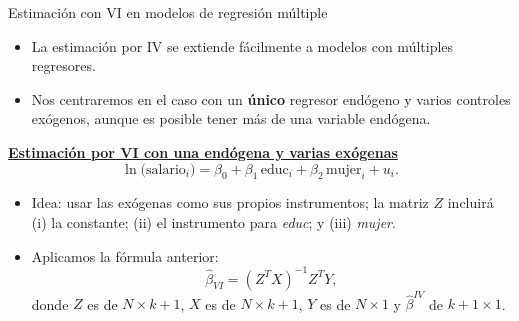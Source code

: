 \documentclass[10pt]{beamer}
\begin{document}
\begin{frame}{Estimaci\'on con VI en modelos de regresi\'on m\'ultiple}
    \begin{itemize}
        \item La estimaci\'on por IV se extiende f\'acilmente a modelos con m\'ultiples regresores.
        \item Nos centraremos en el caso con un \textbf{\'unico} regresor end\'ogeno y varios controles ex\'ogenos, aunque es posible tener m\'as de una variable end\'ogena.
    \end{itemize}

    \underline{\textbf{Estimaci\'on por VI con una end\'ogena y varias ex\'ogenas}}\\[4pt]
    $$
    \ln \bigl(\text{salario}_{i}\bigr)=\beta_{0}+\beta_{1}\, \text{educ}_{i}+\beta_{2}\, \text{mujer}_{i}+u_{i}.
    $$
    \begin{itemize}
        \item Idea: usar las ex\'ogenas como sus propios instrumentos; la matriz $Z$ incluir\'a (i) la constante; (ii) el instrumento para \textit{educ}; y (iii) \textit{mujer}.
        \item Aplicamos la f\'ormula anterior:
        $$
        \hat{\beta}_{VI}=(Z^{T}X)^{-1}Z^{T}Y,
        $$
        donde $Z$ es de $N\times k+1$, $X$ es de $N\times k+1$, $Y$ es de $N\times 1$ y $\hat{\beta}^{IV}$ de $k+1\times 1$.
    \end{itemize}
\end{frame}

\end{document}

